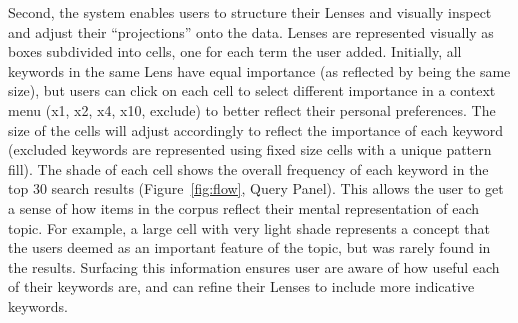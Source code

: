 \documentclass{sigchi}
\begin{document}
Second, the system enables users to structure their Lenses and visually inspect and adjust their ``projections'' onto the data. Lenses are represented visually as boxes subdivided into cells, one for each term the user added. Initially, all keywords in the same Lens have equal importance (as reflected by being the same size), but users can click on each cell to select different importance in a context menu (x1, x2, x4, x10, exclude) to better reflect their personal preferences. The size of the cells will adjust accordingly to reflect the importance of each keyword (excluded keywords are represented using fixed size cells with a unique pattern fill). The shade of each cell shows the overall frequency of each keyword in the top 30 search results (Figure~\ref{fig:flow}, Query Panel). This allows the user to get a sense of how items in the corpus reflect their mental representation of each topic. For example, a large cell with very light shade represents a concept that the users deemed as an important feature of the topic, but was rarely found in the results. Surfacing this information ensures user are aware of how useful each of their keywords are, and can refine their Lenses to include more indicative keywords.



\end{document}
